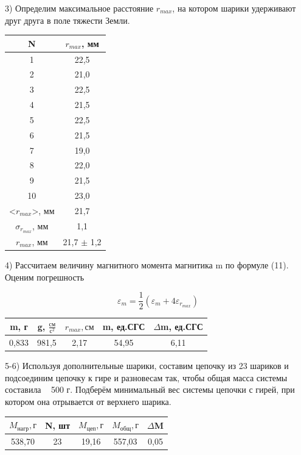 \documentclass[a4paper,12pt]{article}
\begin{document}
3) Определим максимальное расстояние $r_{max}$, на котором шарики удерживают друг друга в поле тяжести Земли.

\begin{center}
\begin{tabular}{|c|c|}
	\hline
	N & $r_{max}$, мм \\
	\hline
	1 & 22,5 \\
	\hline
	2 & 21,0 \\
	\hline
	3 & 22,5 \\
	\hline
	4 & 21,5 \\
	\hline
	5 & 22,5 \\
	\hline
	6 & 21,5 \\
	\hline
	7 & 19,0 \\
	\hline
	8 & 22,0 \\
	\hline
	9 & 21,5 \\
	\hline
	10 & 23,0 \\
	\hline
	<$r_{max}$>, мм & 21,7 \\
	\hline
	$\sigma_{r_{max}}$, мм & 1,1\\
	\hline
	$r_{max}$, мм & 21,7 $\pm$ 1,2 \\
	\hline
\end{tabular}
\end{center}

4) Рассчитаем величину магнитного момента магнитика m по формуле (11). Оценим погрешность 

$$ \varepsilon_m = \frac{1}{2}(\varepsilon_m + 4\varepsilon_{r_{max}})  $$

\begin{center}
\begin{tabular}{|c|c|c|c|c|}
	\hline
	m, г & g, $\frac{см}{с^2}$ & $r_{max}, см$ & m, ед.СГС & $\Delta$m, ед.СГС \\
	\hline
	0,833 & 981,5 & 2,17 & 54,95 & 6,11 \\
	\hline
\end{tabular}
\end{center}

5-6) Используя дополнительные шарики, составим цепочку из 23 шариков и подсоединим цепочку к гире и разновесам так, чтобы общая масса системы составила ~ 500 г. Подберём минимальный вес системы цепочки с гирей, при котором она отрывается от верхнего шарика. 

\begin{center}
\begin{tabular}{|c|c|c|c|c|}
	\hline
	$M_{нагр}, г$ &  N, шт & $M_{цеп}, г$ & $M_{общ}, г$ & $\Delta$M \\
	\hline
	538,70 & 23 & 19,16 & 557,03 & 0,05 \\
	\hline
\end{tabular}
\end{center}
\end{document}
